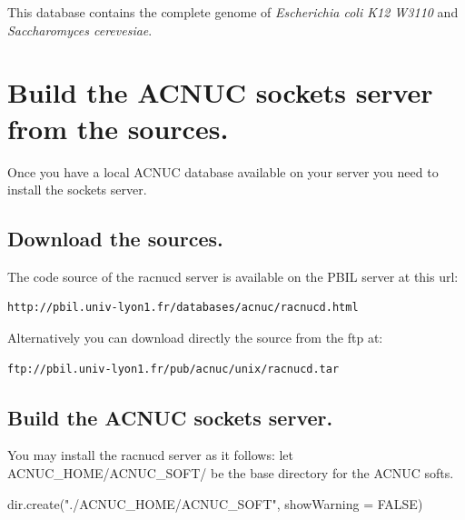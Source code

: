 \documentclass{article}
\begin{document}
This database contains the complete genome of \textit{Escherichia coli K12 W3110} and
\textit{Saccharomyces cerevesiae}.

\section{Build the ACNUC sockets server from the sources.}

Once you have a local  ACNUC database available on your server you need to install the sockets server.

\subsection{Download the sources.}

The code source of the racnucd server is available on the PBIL server  at this url:
\begin{verbatim}
http://pbil.univ-lyon1.fr/databases/acnuc/racnucd.html
\end{verbatim}
Alternatively you can download directly  the source from the ftp at:
\begin{verbatim}
ftp://pbil.univ-lyon1.fr/pub/acnuc/unix/racnucd.tar
\end{verbatim}

\subsection{Build the ACNUC sockets server.}

You may install the racnucd server as it follows:
let ACNUC\_HOME/ACNUC\_SOFT/ be the base directory for the ACNUC softs.

\begin{Schunk}
\begin{Sinput}
 dir.create("./ACNUC_HOME/ACNUC_SOFT", showWarning = FALSE)
\end{Sinput}
\end{Schunk}
\end{document}
